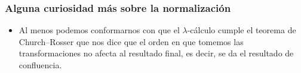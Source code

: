 \documentclass[spanish, a4paper, 12pt, final, slideColor, nototal, colorBG, pdf, noaccumulate, darkblue] {beamer}
\begin{document}
\begin{frame}
    \frametitle{Alguna curiosidad más sobre la normalización}
    \begin{itemize}
        \item Al menos podemos conformarnos con que el $\lambda$-cálculo cumple el teorema de Church–Rosser que nos dice que el orden en que tomemos las transformaciones no afecta al resultado final, es decir, se da el resultado de confluencia.
    \end{itemize}
\end{frame}
\end{document}
